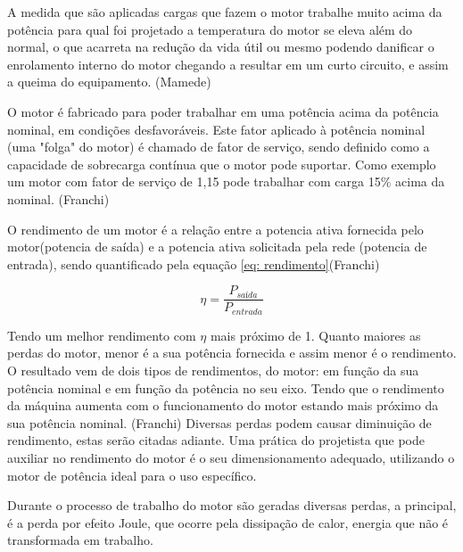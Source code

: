 A medida que são aplicadas cargas que fazem o motor trabalhe  muito acima da potência para qual foi projetado a temperatura do motor se eleva além do normal, o que acarreta na redução da vida útil ou mesmo podendo danificar o enrolamento interno do motor chegando a resultar em um curto circuito, e assim a queima do equipamento. (Mamede) %

O motor é fabricado para poder trabalhar em uma potência acima da potência nominal, em condições desfavoráveis. Este fator aplicado à potência nominal (uma "folga" do motor) é chamado de fator de serviço, sendo definido como a capacidade de sobrecarga contínua que o motor pode suportar. Como exemplo um motor com fator de serviço de  1,15 pode trabalhar com carga 15\% acima da nominal.  (Franchi)  %


O rendimento de um motor é a relação entre a potencia ativa fornecida pelo motor(potencia de saída) e a potencia ativa solicitada pela rede (potencia de entrada), sendo quantificado pela equação \ref{eq: rendimento}(Franchi)  %
 

\begin{equation}
\eta = \frac{P_{saída}}{P_{entrada}}
\label{eq: rendimento}
\end{equation}

Tendo um melhor rendimento com $\eta$ mais próximo de 1. Quanto maiores as perdas do motor, menor é a sua potência fornecida e assim menor é o rendimento.
O resultado vem de dois tipos de rendimentos, do motor: em função da sua potência nominal e em função da potência no seu eixo.  Tendo que o rendimento da máquina aumenta com o funcionamento do motor estando mais próximo da sua potência nominal. (Franchi)  %
Diversas perdas podem causar diminuição de rendimento, estas serão citadas adiante. 
Uma prática do projetista que pode auxiliar no rendimento do motor é o seu dimensionamento adequado, utilizando o motor de  potência ideal para o uso específico.




Durante o processo de trabalho do motor são geradas diversas perdas, a principal, é a perda por efeito Joule, que ocorre pela dissipação de calor, energia que não é transformada em trabalho. 


